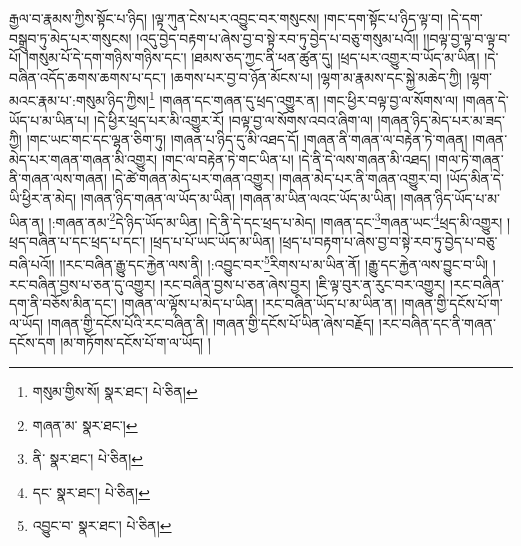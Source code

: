 རྒྱལ་བ་རྣམས་ཀྱིས་སྟོང་པ་ཉིད། །ལྟ་ཀུན་ངེས་པར་འབྱུང་བར་གསུངས། །གང་དག་སྟོང་པ་ཉིད་ལྟ་བ། །དེ་དག་བསྒྲུབ་ཏུ་མེད་པར་གསུངས། །འདུ་བྱེད་བརྟག་པ་ཞེས་བྱ་བ་སྟེ་རབ་ཏུ་བྱེད་པ་བཅུ་གསུམ་པའོ།། །།བལྟ་བྱ་ལྟ་བ་ལྟ་བ་པོ། །གསུམ་པོ་དེ་དག་གཉིས་གཉིས་དང་། །ཐམས་ཅད་ཀྱང་ནི་ཕན་ཚུན་དུ། །ཕྲད་པར་འགྱུར་བ་ཡོད་མ་ཡིན། །དེ་བཞིན་འདོད་ཆགས་ཆགས་པ་དང་། །ཆགས་པར་བྱ་བ་ཉོན་མོངས་པ། །ལྷག་མ་རྣམས་དང་སྐྱེ་མཆེད་ཀྱི། །ལྷག་མའང་རྣམ་པ་:གསུམ་ཉིད་ཀྱིས།\footnote{གསུམ་གྱིས་སོ།  སྣར་ཐང་།  པེ་ཅིན། } །གཞན་དང་གཞན་དུ་ཕྲད་འགྱུར་ན། །གང་ཕྱིར་བལྟ་བྱ་ལ་སོགས་ལ། །གཞན་དེ་ཡོད་པ་མ་ཡིན་པ། །དེ་ཕྱིར་ཕྲད་པར་མི་འགྱུར་རོ། །བལྟ་བྱ་ལ་སོགས་འབའ་ཞིག་ལ། །གཞན་ཉིད་མེད་པར་མ་ཟད་ཀྱི། །གང་ཡང་གང་དང་ལྷན་ཅིག་ཏུ། །གཞན་པ་ཉིད་དུ་མི་འཐད་དོ། །གཞན་ནི་གཞན་ལ་བརྟེན་ཏེ་གཞན། །གཞན་མེད་པར་གཞན་གཞན་མི་འགྱུར། །གང་ལ་བརྟེན་ཏེ་གང་ཡིན་པ། །དེ་ནི་དེ་ལས་གཞན་མི་འཐད། །གལ་ཏེ་གཞན་ནི་གཞན་ལས་གཞན། །དེ་ཚེ་གཞན་མེད་པར་གཞན་འགྱུར། །གཞན་མེད་པར་ནི་གཞན་འགྱུར་བ། །ཡོད་མིན་དེ་ཡི་ཕྱིར་ན་མེད། །གཞན་ཉིད་གཞན་ལ་ཡོད་མ་ཡིན། །གཞན་མ་ཡིན་ལའང་ཡོད་མ་ཡིན། །གཞན་ཉིད་ཡོད་པ་མ་ཡིན་ན། །:གཞན་ནམ་\footnote{གཞན་མ་  སྣར་ཐང་། }དེ་ཉིད་ཡོད་མ་ཡིན། །དེ་ནི་དེ་དང་ཕྲད་པ་མེད། །གཞན་དང་\footnote{ནི་  སྣར་ཐང་།  པེ་ཅིན། }གཞན་ཡང་\footnote{དང་  སྣར་ཐང་།  པེ་ཅིན། }ཕྲད་མི་འགྱུར། །ཕྲད་བཞིན་པ་དང་ཕྲད་པ་དང་། །ཕྲད་པ་པོ་ཡང་ཡོད་མ་ཡིན། །ཕྲད་པ་བརྟག་པ་ཞེས་བྱ་བ་སྟེ་རབ་ཏུ་བྱེད་པ་བཅུ་བཞི་པའོ།། །།རང་བཞིན་རྒྱུ་དང་རྐྱེན་ལས་ནི། །:འབྱུང་བར་\footnote{འབྱུང་བ་  སྣར་ཐང་།  པེ་ཅིན། }རིགས་པ་མ་ཡིན་ནོ། །རྒྱུ་དང་རྐྱེན་ལས་བྱུང་བ་ཡི། །རང་བཞིན་བྱས་པ་ཅན་དུ་འགྱུར། །རང་བཞིན་བྱས་པ་ཅན་ཞེས་བྱར། །ཇི་ལྟ་བུར་ན་རུང་བར་འགྱུར། །རང་བཞིན་དག་ནི་བཅོས་མིན་དང་། །གཞན་ལ་ལྟོས་པ་མེད་པ་ཡིན། །རང་བཞིན་ཡོད་པ་མ་ཡིན་ན། །གཞན་གྱི་དངོས་པོ་ག་ལ་ཡོད། །གཞན་གྱི་དངོས་པོའི་རང་བཞིན་ནི། །གཞན་གྱི་དངོས་པོ་ཡིན་ཞེས་བརྗོད། །རང་བཞིན་དང་ནི་གཞན་དངོས་དག །མ་གཏོགས་དངོས་པོ་ག་ལ་ཡོད། །
